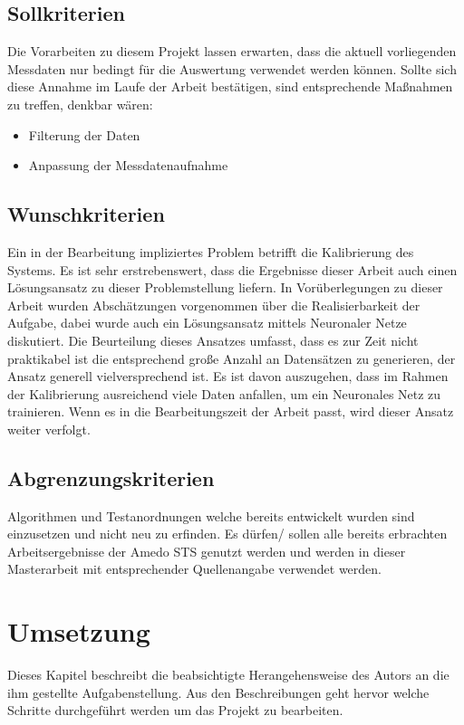 \documentclass[a4paper,12pt,fleqn]{article}
\begin{document}
\subsection{Sollkriterien}
Die Vorarbeiten zu diesem Projekt lassen erwarten, dass die aktuell vorliegenden Messdaten nur bedingt für die Auswertung verwendet werden können. Sollte sich diese Annahme im Laufe der Arbeit bestätigen, sind entsprechende Maßnahmen zu treffen, denkbar wären:
\begin{itemize}
\item Filterung der Daten
\item Anpassung der Messdatenaufnahme
\end{itemize}
\subsection{Wunschkriterien}
Ein in der Bearbeitung impliziertes Problem betrifft die Kalibrierung des Systems. Es ist sehr erstrebenswert, dass die Ergebnisse dieser Arbeit auch einen Lösungsansatz zu dieser Problemstellung liefern. In Vorüberlegungen zu dieser Arbeit wurden Abschätzungen vorgenommen über die Realisierbarkeit der Aufgabe, dabei wurde auch ein Lösungsansatz mittels Neuronaler Netze diskutiert. Die Beurteilung dieses Ansatzes umfasst, dass es zur Zeit nicht praktikabel ist die entsprechend große Anzahl an Datensätzen zu generieren, der Ansatz generell vielversprechend ist. Es ist davon auszugehen, dass im Rahmen der Kalibrierung ausreichend viele Daten anfallen, um ein Neuronales Netz zu trainieren. Wenn es in die Bearbeitungszeit der Arbeit passt, wird dieser Ansatz weiter verfolgt.
\subsection{Abgrenzungskriterien}
Algorithmen und Testanordnungen welche bereits entwickelt wurden sind einzusetzen und nicht neu zu erfinden. Es dürfen/ sollen alle bereits erbrachten Arbeitsergebnisse der Amedo STS genutzt werden und werden in dieser Masterarbeit mit entsprechender Quellenangabe verwendet werden.

\section{Umsetzung}
Dieses Kapitel beschreibt die beabsichtigte Herangehensweise des Autors an die
ihm gestellte Aufgabenstellung. Aus den Beschreibungen geht hervor welche Schritte durchgeführt werden um das Projekt zu bearbeiten.
\end{document}

